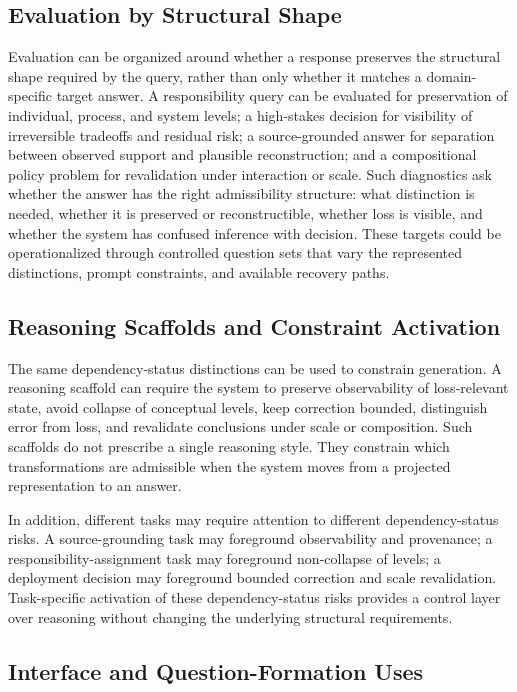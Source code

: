 \documentclass[11pt]{article}
\begin{document}
\subsection{Evaluation by Structural Shape}

Evaluation can be organized around whether a response preserves the structural shape required by the query, rather than only whether it matches a domain-specific target answer. A responsibility query can be evaluated for preservation of individual, process, and system levels; a high-stakes decision for visibility of irreversible tradeoffs and residual risk; a source-grounded answer for separation between observed support and plausible reconstruction; and a compositional policy problem for revalidation under interaction or scale. Such diagnostics ask whether the answer has the right admissibility structure: what distinction is needed, whether it is preserved or reconstructible, whether loss is visible, and whether the system has confused inference with decision. These targets could be operationalized through controlled question sets that vary the represented distinctions, prompt constraints, and available recovery paths.

\subsection{Reasoning Scaffolds and Constraint Activation}

The same dependency-status distinctions can be used to constrain generation. A reasoning scaffold can require the system to preserve observability of loss-relevant state, avoid collapse of conceptual levels, keep correction bounded, distinguish error from loss, and revalidate conclusions under scale or composition. Such scaffolds do not prescribe a single reasoning style. They constrain which transformations are admissible when the system moves from a projected representation to an answer.

In addition, different tasks may require attention to different dependency-status risks. A source-grounding task may foreground observability and provenance; a responsibility-assignment task may foreground non-collapse of levels; a deployment decision may foreground bounded correction and scale revalidation. Task-specific activation of these dependency-status risks provides a control layer over reasoning without changing the underlying structural requirements.

\subsection{Interface and Question-Formation Uses}
\end{document}
